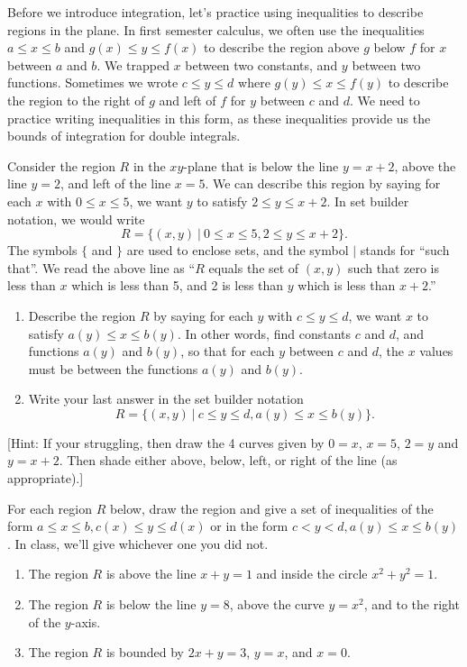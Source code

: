 Before we introduce integration, let's practice using inequalities to describe regions in the plane.  In first semester calculus, we often use the inequalities $a\leq x\leq b$ and $g(x)\leq y\leq f(x)$ to describe the region above $g$ below $f$ for $x$ between $a$ and $b$.  We trapped $x$ between two constants, and $y$ between two functions.  Sometimes we wrote $c\leq y\leq d$ where $g(y)\leq x\leq f(y)$ to describe the region to the right of $g$ and left of $f$ for $y$ between $c$ and $d$. We need to practice writing inequalities in this form, as these inequalities provide us the bounds of integration for double integrals.


\begin{problem}
 Consider the region $R$ in the $xy$-plane that is below the line $y=x+2$, above the line $y=2$, and left of the line $x=5$. We can describe this region by saying for each $x$ with $0\leq x\leq 5$, we want $y$ to satisfy $2\leq y\leq x+2$. In set builder notation, we would write
$$R=\{(x,y)\ | \ 0\leq x\leq 5, 2\leq y\leq x+2\}.$$
The symbols $\{$ and $\}$ are used to enclose sets, and the symbol $|$ stands for ``such that''. We read the above line as ``$R$ equals the set of $(x,y)$ such that zero is less than $x$ which is less than 5, and 2 is less than $y$ which is less than $x+2$.''
\begin{enumerate}
 \item Describe the region $R$ by saying for each $y$ with $c\leq y\leq d$, we want $x$ to satisfy $a(y)\leq x\leq b(y)$. In other words, find constants $c$ and $d$, and functions $a(y)$ and $b(y)$, so that for each $y$ between $c$ and $d$, the $x$ values must be between the functions $a(y)$ and $b(y)$.
 \item Write your last answer in the set builder notation
$$R=\{(x,y)\ | \ c\leq y\leq d, a(y)\leq x\leq b(y)\}.$$
\end{enumerate}
[Hint:  If your struggling, then draw the 4 curves given by $0=x$, $x= 5$, $2=y$ and $y= x+2$.  Then shade either above, below, left, or right of the line (as appropriate).]
\end{problem}

\begin{problem}
For each region $R$ below, draw the region and give a set of inequalities of the form $a\leq x\leq b, c(x)\leq y\leq d(x)$ or in the form $c<y<d, a(y)\leq x\leq b(y)$. In class, we'll give whichever one you did not. 
\begin{enumerate}
 \item The region $R$ is above the line $x+y=1$ and inside the circle $x^2+y^2=1$.
 \item The region $R$ is below the line $y=8$, above the curve $y=x^2$, and to the right of the $y$-axis.
 \item The region $R$ is bounded by $2x+y=3$, $y=x$, and $x=0$. 
\end{enumerate}
\end{problem}

